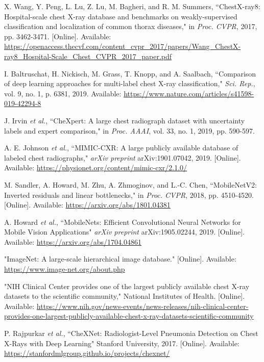 \documentclass[12pt]{article}
\begin{document}
\begin{thebibliography}{99}
X. Wang, Y. Peng, L. Lu, Z. Lu, M. Bagheri, and R. M. Summers, ``ChestX-ray8: Hospital-scale chest X-ray database and benchmarks on weakly-supervised classification and localization of common thorax diseases," in \textit{Proc. CVPR}, 2017, pp. 3462-3471. [Online]. Available: \url{https://openaccess.thecvf.com/content_cvpr_2017/papers/Wang_ChestX-ray8_Hospital-Scale_Chest_CVPR_2017_paper.pdf}

I. Baltruschat, H. Nickisch, M. Grass, T. Knopp, and A. Saalbach, ``Comparison of deep learning approaches for multi-label chest X-ray classification," \textit{Sci. Rep.}, vol. 9, no. 1, p. 6381, 2019. Available: \url{https://www.nature.com/articles/s41598-019-42294-8}

J. Irvin \textit{et al.}, ``CheXpert: A large chest radiograph dataset with uncertainty labels and expert comparison," in \textit{Proc. AAAI}, vol. 33, no. 1, 2019, pp. 590-597.

A. E. Johnson \textit{et al.}, ``MIMIC-CXR: A large publicly available database of labeled chest radiographs," \textit{arXiv preprint} arXiv:1901.07042, 2019. [Online]. Available: \url{https://physionet.org/content/mimic-cxr/2.1.0/}

M. Sandler, A. Howard, M. Zhu, A. Zhmoginov, and L.-C. Chen, ``MobileNetV2: Inverted residuals and linear bottlenecks," in \textit{Proc. CVPR}, 2018, pp. 4510-4520. [Online]. Available: \url{https://arxiv.org/abs/1801.04381}

A. Howard \textit{et al.}, ``MobileNets: Efficient Convolutional Neural Networks for Mobile Vision Applications" \textit{arXiv preprint} arXiv:1905.02244, 2019. [Online]. Available: \url{https://arxiv.org/abs/1704.04861}

"ImageNet: A large-scale hierarchical image database." [Online]. Available: \url{https://www.image-net.org/about.php}

"NIH Clinical Center provides one of the largest publicly available chest X-ray datasets to the scientific community," National Institutes of Health. [Online]. Available: \url{https://www.nih.gov/news-events/news-releases/nih-clinical-center-provides-one-largest-publicly-available-chest-x-ray-datasets-scientific-community}

P. Rajpurkar \textit{et al.}, ``CheXNet: Radiologist-Level Pneumonia Detection on Chest X-Rays with Deep Learning" Stanford University, 2017. [Online]. Available: \url{https://stanfordmlgroup.github.io/projects/chexnet/}


\end{thebibliography}
\end{document}
